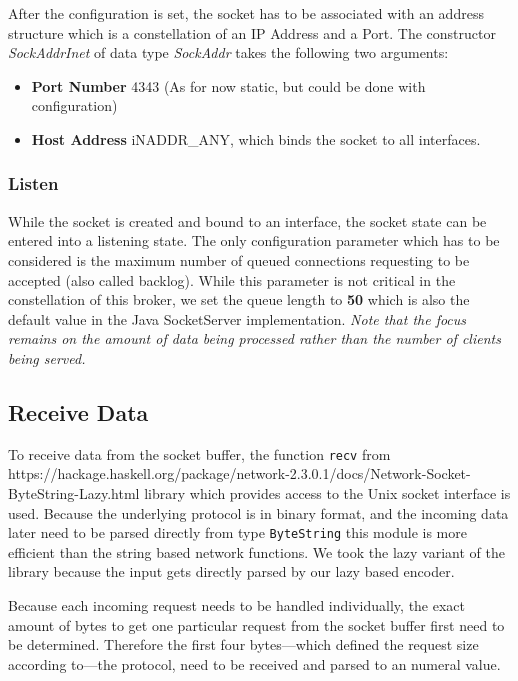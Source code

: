 After the configuration is set, the socket has to be associated with an address
structure which is a constellation of an IP Address and a Port. The constructor
\textit{SockAddrInet} of data type \textit{SockAddr} takes the following
two arguments:

\begin{itemize}
    \item {\bf Port Number} 4343 (As for now static, but could be done with configuration)
    \item {\bf Host Address} iNADDR\_ANY, which binds the socket to all interfaces.
\end{itemize}

\subsubsection{Listen}

While the socket is created and bound to an interface, the socket state can be
entered into a listening state. The only configuration parameter which has to be
considered is the maximum number of queued connections requesting to
be accepted (also called backlog). While this parameter is not critical in the
constellation of this broker, we set the queue length to \textbf{50} which is
also the default value in the Java SocketServer implementation. \textit{Note
that the focus remains on the amount of data being processed rather than the
number of clients being served.}

\subsection{Receive Data}
\label{sec:impl-broker-socket-receive}
To receive data from the socket buffer, the function \lstinline{recv} from\\
{https://hackage.haskell.org/package/network-2.3.0.1/docs/Network-Socket-ByteString-Lazy.html}
library which provides access to the Unix socket interface is used. Because the underlying 
protocol is in binary format, and the incoming data later need to be parsed
directly from type \lstinline{ByteString} this module is more efficient than
the string based network functions. We took the lazy variant of the library
because the input gets directly parsed by our lazy based encoder.

Because each incoming request needs to be handled individually, the exact
amount of bytes to get one particular request from the socket buffer first need
to be determined. Therefore the first four bytes---which defined the request
size according to---the protocol, need to be received and parsed to an numeral
value.

